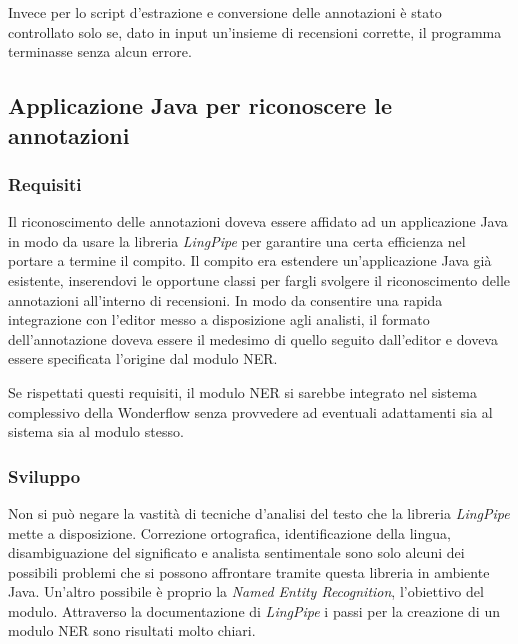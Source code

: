 Invece per lo \gls{script} d'estrazione e conversione delle annotazioni è stato
controllato solo se, dato in input un'insieme di recensioni corrette, il
programma terminasse senza alcun errore.

\subsection{Applicazione Java per riconoscere le annotazioni}
\subsubsection{Requisiti}
Il riconoscimento delle annotazioni doveva essere affidato ad un applicazione
Java in modo da usare la libreria \textit{LingPipe} per garantire una certa
efficienza nel portare a termine il compito. Il compito era estendere
un'applicazione Java già esistente, inserendovi le opportune classi per fargli
svolgere il riconoscimento delle annotazioni all'interno di recensioni. In modo
da consentire una rapida integrazione con l'editor messo a disposizione agli
analisti, il formato dell'annotazione doveva essere il medesimo di quello
seguito dall'editor e doveva essere specificata l'origine dal modulo \gls{NER}.

Se rispettati questi requisiti, il modulo \gls{NER} si sarebbe integrato nel
sistema complessivo della Wonderflow senza provvedere ad eventuali adattamenti
sia al sistema sia al modulo stesso.

\subsubsection{Sviluppo}
Non si può negare la vastità di tecniche d'analisi del testo che la libreria
\textit{LingPipe} mette a disposizione. Correzione ortografica, identificazione
della lingua, disambiguazione del significato e analista sentimentale sono solo
alcuni dei possibili problemi che si possono affrontare tramite questa libreria
in ambiente Java. Un'altro possibile è proprio la
\textit{Named Entity Recognition}, l'obiettivo del modulo. Attraverso la
documentazione di \textit{LingPipe} i passi per la creazione di un modulo
\gls{NER} sono risultati molto chiari.


